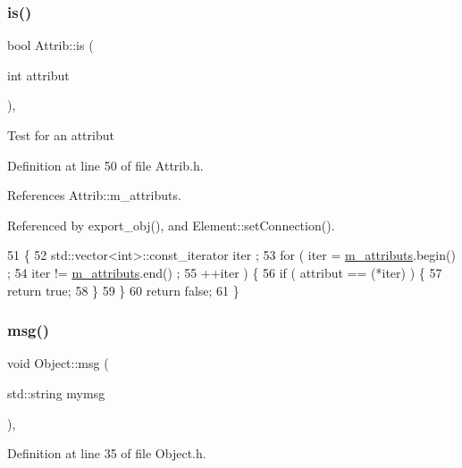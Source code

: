 \subsubsection{\texorpdfstring{is()}{is()}}
{\footnotesize\ttfamily bool Attrib\+::is (\begin{DoxyParamCaption}\item[{int}]{attribut }\end{DoxyParamCaption})\hspace{0.3cm}{\ttfamily [inline]}, {\ttfamily [inherited]}}

Test for an attribut 

Definition at line 50 of file Attrib.\+h.



References Attrib\+::m\+\_\+attributs.



Referenced by export\+\_\+obj(), and Element\+::set\+Connection().


\begin{DoxyCode}
51   \{
52     std::vector<int>::const\_iterator iter ;
53     \textcolor{keywordflow}{for} ( iter  = \hyperlink{classAttrib_ac4bd58a0cc6b38a3b711d609a3d3aacc}{m\_attributs}.begin() ;
54           iter != \hyperlink{classAttrib_ac4bd58a0cc6b38a3b711d609a3d3aacc}{m\_attributs}.end()   ;
55           ++iter ) \{
56       \textcolor{keywordflow}{if} ( attribut == (*iter) ) \{
57         \textcolor{keywordflow}{return} \textcolor{keyword}{true};
58       \}
59     \}
60     \textcolor{keywordflow}{return} \textcolor{keyword}{false};
61   \}
\end{DoxyCode}
\mbox{\label{classObject_a58b2d0618c2d08cf2383012611528d97}} 
\subsubsection{\texorpdfstring{msg()}{msg()}\hspace{0.1cm}{\footnotesize\ttfamily [1/2]}}
{\footnotesize\ttfamily void Object\+::msg (\begin{DoxyParamCaption}\item[{std\+::string}]{mymsg }\end{DoxyParamCaption})\hspace{0.3cm}{\ttfamily [inline]}, {\ttfamily [inherited]}}



Definition at line 35 of file Object.\+h.



